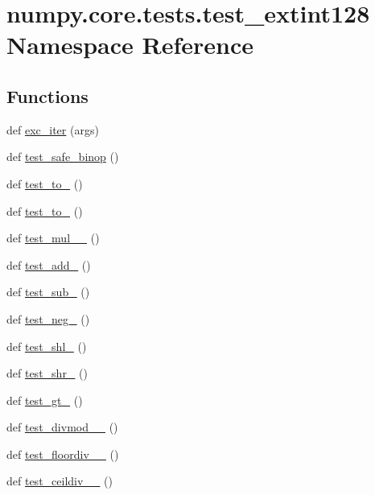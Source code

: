 \hypertarget{namespacenumpy_1_1core_1_1tests_1_1test__extint128}{}\section{numpy.\+core.\+tests.\+test\+\_\+extint128 Namespace Reference}
\label{namespacenumpy_1_1core_1_1tests_1_1test__extint128}
\subsection*{Functions}
\begin{DoxyCompactItemize}
\item 
def \hyperlink{namespacenumpy_1_1core_1_1tests_1_1test__extint128_a96f304bcd73d8e14f30c0d83fd9569fa}{exc\+\_\+iter} (args)
\item 
def \hyperlink{namespacenumpy_1_1core_1_1tests_1_1test__extint128_a760aaa98a2b14330acef70bf121dbd48}{test\+\_\+safe\+\_\+binop} ()
\item 
def \hyperlink{namespacenumpy_1_1core_1_1tests_1_1test__extint128_a80e8ccb815ec4bdc5e3e0f7b01a183be}{test\+\_\+to\+\_} ()
\item 
def \hyperlink{namespacenumpy_1_1core_1_1tests_1_1test__extint128_af3cd600c24be81a28c7f8e00f20f951e}{test\+\_\+to\+\_} ()
\item 
def \hyperlink{namespacenumpy_1_1core_1_1tests_1_1test__extint128_acb365014424541a67431f1f7c8a8364a}{test\+\_\+mul\+\_\+\_} ()
\item 
def \hyperlink{namespacenumpy_1_1core_1_1tests_1_1test__extint128_a7bf96fcc60c011fe6c7e0437bdb7bb8e}{test\+\_\+add\+\_} ()
\item 
def \hyperlink{namespacenumpy_1_1core_1_1tests_1_1test__extint128_aa6b4ce5b9066f7b006ee7cb7cc62f91d}{test\+\_\+sub\+\_} ()
\item 
def \hyperlink{namespacenumpy_1_1core_1_1tests_1_1test__extint128_a99115d4f254940a8e1df5d35226993e6}{test\+\_\+neg\+\_} ()
\item 
def \hyperlink{namespacenumpy_1_1core_1_1tests_1_1test__extint128_acedbf886eeebdc1cad2c2bc84e4ff0da}{test\+\_\+shl\+\_} ()
\item 
def \hyperlink{namespacenumpy_1_1core_1_1tests_1_1test__extint128_afe3c59a68fa1a50a4a3334abf4e282de}{test\+\_\+shr\+\_} ()
\item 
def \hyperlink{namespacenumpy_1_1core_1_1tests_1_1test__extint128_ac673424ffef5e547da0ac5b4ae0bb85c}{test\+\_\+gt\+\_} ()
\item 
def \hyperlink{namespacenumpy_1_1core_1_1tests_1_1test__extint128_a14f7d4566ac5110fcb7678828e319fe0}{test\+\_\+divmod\+\_\+\_} ()
\item 
def \hyperlink{namespacenumpy_1_1core_1_1tests_1_1test__extint128_a8be0a4b02b1e1bf6b1c0ef4696edfefc}{test\+\_\+floordiv\+\_\+\_} ()
\item 
def \hyperlink{namespacenumpy_1_1core_1_1tests_1_1test__extint128_a1f17d6c6b2216d001253bbf36ebbe853}{test\+\_\+ceildiv\+\_\+\_} ()
\end{DoxyCompactItemize}
